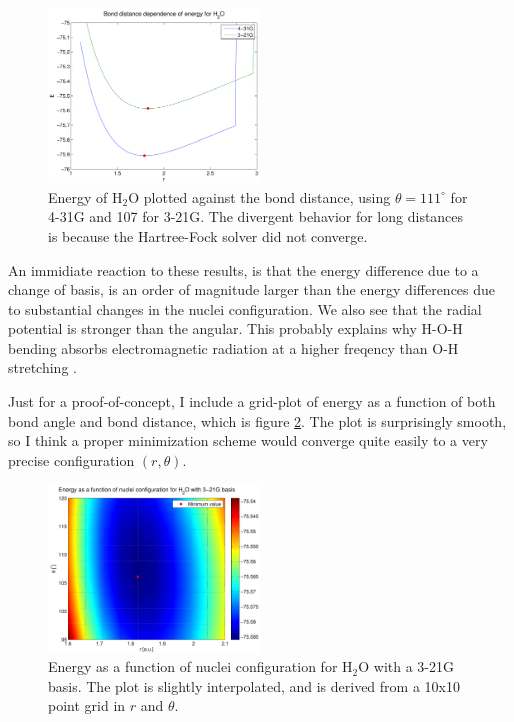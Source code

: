 \documentclass[a4paper,10pt, twocolumn, pre]{revtex4}
\begin{document}
\begin{figure}
\includegraphics[width=0.5\textwidth]{figures/H2O_distance_energy.pdf}
\caption{Energy of H$_2$O plotted against the bond distance, using $\theta=111^\circ$ for 4-31G and 107 for 3-21G. The divergent behavior for long distances is because the Hartree-Fock solver did not converge.}
\label{fig:distanceh2o}
\end{figure}

An immidiate reaction to these results, is that the energy difference due to a change of basis, is an order of magnitude larger than the energy differences due to substantial changes in the nuclei configuration. We also see that the radial potential is stronger than the angular. This probably explains why H-O-H bending absorbs electromagnetic radiation at a higher freqency than O-H stretching \cite{Wikipedia}.

Just for a proof-of-concept, I include a grid-plot of energy as a function of both bond angle and bond distance, which is figure \ref{fig:configh2o}. The plot is surprisingly smooth, so I think a proper minimization scheme would converge quite easily to a very precise configuration $(r, \theta)$.

\begin{figure}
\includegraphics[width=0.5\textwidth]{figures/H2Oconfig_321g.pdf}
\caption{Energy as a function of nuclei configuration for H$_2$O with a 3-21G basis. The plot is slightly interpolated, and is derived from a 10x10 point grid in $r$ and $\theta$.}
\label{fig:configh2o}
\end{figure}
\end{document}
